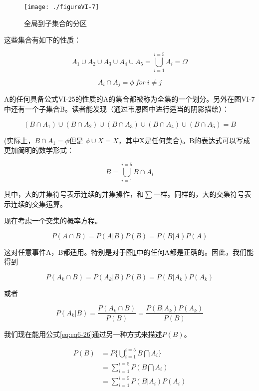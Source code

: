 \documentclass[cn,11pt,chinese]{elegantbook}
\begin{document}
\begin{figure}
	\texttt{[image: ./figureVI-7]}
	\caption{全局到子集合的分区}
	\label{fig:fig6-7}
\end{figure}


这些集合有如下的性质：


\begin{equation}\label{eq25}
A_1\cup A_2 \cup A_3 \cup A_4 \cup A_5 = \bigcup_{i=1}^{i=5}A_i=\Omega 
\end{equation}

$$ A_i\cap A_j=\phi \ for \ i\neq j$$

A的任何具备公式VI-25的性质的A的集合都被称为全集的一个划分。另外在图VI-7中还有一个子集合B。读者能发现（通过韦恩图中进行适当的阴影描绘）：

$$(B\cap A_1)\cup(B\cap A_2)\cup(B\cap A_3)\cup(B\cap A_4)\cup(B\cap A_5)=B$$

(实际上，$B\cap A_1 = \phi $但是 $\phi \cup X=X$，其中X是任何集合)。B的表达式可以写成更加简明的数学形式：

\begin{equation}\label{eq:eq6-26}
B=\bigcup_{i=1}^{i=5}B\cap A_i
\end{equation}

其中，大的并集符号表示连续的并集操作，和$\sum$一样。同样的，大的交集符号表示连续的交集运算。

现在考虑一个交集的概率方程。

$$P(A\cap B)=P(A |B)P(B)=P(B|A)P(A)$$

这对任意事件A，B都适用。特别是对于图\ref{fig:fig6-7}中的任何A都是正确的。因此，我们能得到

\begin{equation}\label{eq:eq6-27}
P(A_k\cap B)=P(A_k|B)P(B)=P(B|A_k)P(A_k)
\end{equation}

或者

\begin{equation}\label{eq6-28}
P(A_k|B)=\frac{P(A_k\cap B)}{P(B)}=\frac{P(B|A_k)P(A_k)}{P(B)}
\end{equation}

我们现在能用公式\ref{eq:eq6-26}通过另一种方式来描述$P(B)$。


\begin{align*}
P(B)&=P\{\bigcup_{i=1}^{i=5}B\bigcap{A_i}\} \\
&=\sum_{i=1}^{i=5}P(B\bigcap A_i) \\
&= \sum_{i=1}^{i=5}P(B|
A_i)P(A_i)
\end{align*}
\end{document}
